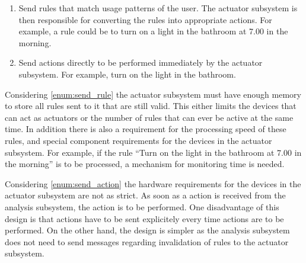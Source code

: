 \begin{enumerate}
\item \label{enum:send_rule} Send rules that match usage patterns of the user.
The actuator subsystem is then responsible for converting the rules into
appropriate actions. For example, a rule could be to turn on a light in the
bathroom at 7.00 in the morning.
\item \label{enum:send_action} Send actions directly to be performed immediately
by the actuator subsystem. For example, turn on the light in the bathroom.
\end{enumerate}

Considering \cref{enum:send_rule} the actuator subsystem must have enough memory
to store all rules sent to it that are still valid. This either limits the
devices that can act as actuators or the number of rules that can ever be active
at the same time. In addition there is also a requirement for the processing
speed of these rules, and special component requirements for the devices in the
actuator subsystem. For example, if the rule \enquote{Turn on the light in the
bathroom at 7.00 in the morning} is to be processed, a mechanism for monitoring
time is needed.

Considering \cref{enum:send_action} the hardware requirements for the devices in
the actuator subsystem are not as strict. As soon as a action is received from
the analysis subsystem, the action is to be performed. One disadvantage of this
design is that actions have to be sent explicitely every time actions are to be
performed. On the other hand, the design is simpler as the analysis subsystem
does not need to send messages regarding invalidation of rules to the actuator
subsystem.

